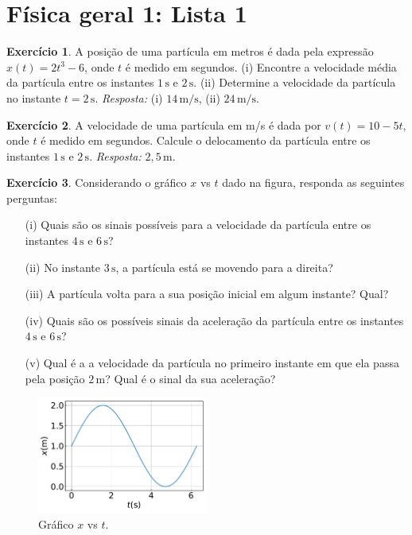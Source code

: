 \documentclass[12pt,a4paper]{article}
\date{}
\theoremstyle{definition}
\newtheorem{ex}{Exercício}
\begin{document}
\section*{Física geral 1: Lista 1}

\begin{ex}
  A posição de uma partícula em metros é dada pela expressão
  $x(t)=2t^3-6$, onde $t$ é medido em segundos. (i) Encontre a
  velocidade média da partícula entre os instantes $1\,\mathrm{s}$ e
  $2\,\mathrm{s}$. (ii) Determine a velocidade da partícula no
  instante $t=2\,\mathrm{s}$. \emph{Resposta:} (i) $14\,\textrm{m/s}$,
  (ii) $24\,\mathrm{m/s}$.
\end{ex}

\begin{ex}
  A velocidade de uma partícula em m/s é dada por $v(t)=10-5t$, onde
  $t$ é medido em segundos. Calcule o delocamento da partícula entre
  os instantes $1\,\mathrm{s}$ e $2\,\mathrm{s}$. \emph{Resposta:}
  $2{,}5\,\mathrm{m}$.
\end{ex}

\begin{ex}
  Considerando o gráfico $x$ vs $t$ dado na figura, responda as
  seguintes perguntas:
  \begin{enumerate}
  \item[(i)] Quais são os sinais possíveis para a velocidade da
    partícula entre os instantes $4\,\mathrm{s}$ e $6\,\mathrm{s}$?
  \item[(ii)] No instante $3\,\mathrm{s}$, a partícula está se movendo
    para a direita?
  \item[(iii)] A partícula volta para a sua posição inicial em algum
    instante? Qual?
  \item[(iv)] Quais são os possíveis sinais da aceleração da partícula
    entre os instantes $4\,\mathrm{s}$ e $6\,\mathrm{s}$?
  \item[(v)] Qual é a a velocidade da partícula no primeiro instante
    em que ela passa pela posição $2\,\mathrm{m}$? Qual é o sinal da
    sua aceleração?
  \end{enumerate}
  \begin{figure}[ht]
    \centering
    \includegraphics[width=0.5\textwidth,keepaspectratio]{xtcurve.pdf}
    \caption{Gráfico $x$ vs $t$.}
    \label{fig:xvst}
  \end{figure}
\end{ex}
\end{document}
